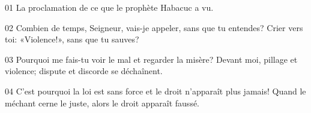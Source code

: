 01 La proclamation de ce que le prophète Habacuc a vu.

02 Combien de temps, Seigneur, vais-je appeler, sans que tu entendes? Crier vers toi: «Violence!», sans que tu sauves?

03 Pourquoi me fais-tu voir le mal et regarder la misère? Devant moi, pillage et violence; dispute et discorde se déchaînent.

04 C’est pourquoi la loi est sans force et le droit n’apparaît plus jamais! Quand le méchant cerne le juste, alors le droit apparaît faussé.

